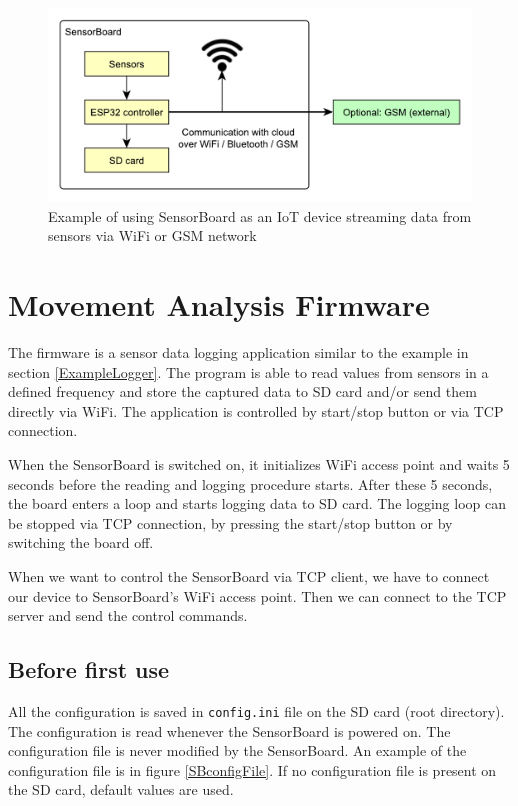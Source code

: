 \begin{figure}
    \centering
    \label{UEIoT}
    \caption{Example of using SensorBoard as an \ac{IoT} device streaming data from sensors via WiFi or GSM network}
    \includegraphics[width=\linewidth]{img/UsageExamplesIoT.pdf}
\end{figure}

\section{Movement Analysis Firmware}
\label{HorseFirmware}
The firmware is a sensor data logging application similar to the example in section \ref{ExampleLogger}. The program is able to read values from sensors in a defined frequency and store the captured data to SD card and/or send them directly via WiFi. The application is controlled by start/stop button or via \ac{TCP} connection.

When the SensorBoard is switched on, it initializes WiFi access point and waits 5 seconds before the reading and logging procedure starts. After these 5 seconds, the board enters a loop and starts logging data to SD card. The logging loop can be stopped via \ac{TCP} connection, by pressing the start/stop button or by switching the board off.

When we want to control the SensorBoard via \ac{TCP} client, we have to connect our device to SensorBoard's WiFi access point. Then we can connect to the \ac{TCP} server and send the control commands.

\subsection{Before first use}
\label{beforeFirstUse}
All the configuration is saved in \texttt{config.ini} file on the SD card (root directory). The configuration is read whenever the SensorBoard is powered on. The configuration file is never modified by the SensorBoard. An example of the configuration file is in figure \ref{SBconfigFile}. If no configuration file is present on the SD card, default values are used.


